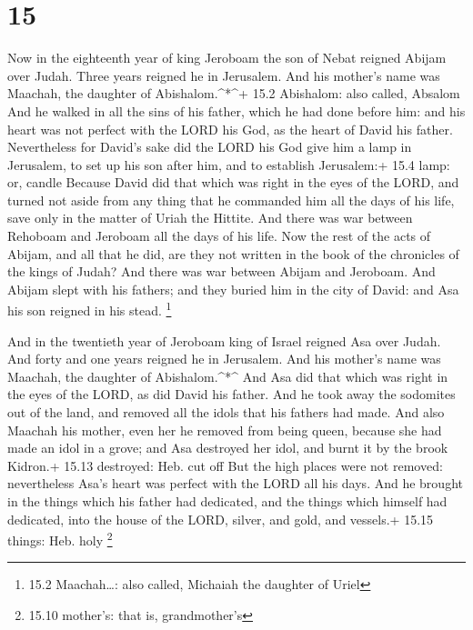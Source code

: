 \hypertarget{section-14}{%
\section{15}\label{section-14}}

 Now in the eighteenth year of king Jeroboam the son of
Nebat reigned Abijam over Judah.  Three years reigned he in
Jerusalem. And his mother's name was Maachah, the daughter of
Abishalom.\^{}*\^{}+ 15.2 Abishalom: also called, Absalom 
And he walked in all the sins of his father, which he had done before
him: and his heart was not perfect with the LORD his God, as the heart
of David his father.  Nevertheless for David's sake did the
LORD his God give him a lamp in Jerusalem, to set up his son after him,
and to establish Jerusalem:+ 15.4 lamp: or, candle  Because
David did that which was right in the eyes of the LORD, and turned not
aside from any thing that he commanded him all the days of his life,
save only in the matter of Uriah the Hittite.  And there was
war between Rehoboam and Jeroboam all the days of his life. 
Now the rest of the acts of Abijam, and all that he did, are they not
written in the book of the chronicles of the kings of Judah? And there
was war between Abijam and Jeroboam.  And Abijam slept with
his fathers; and they buried him in the city of David: and Asa his son
reigned in his stead. \footnote{15.2 Maachah\ldots: also called,
  Michaiah the daughter of Uriel}

 And in the twentieth year of Jeroboam king of Israel
reigned Asa over Judah.  And forty and one years reigned he
in Jerusalem. And his mother's name was Maachah, the daughter of
Abishalom.\^{}*\^{}  And Asa did that which was right in
the eyes of the LORD, as did David his father.  And he took
away the sodomites out of the land, and removed all the idols that his
fathers had made.  And also Maachah his mother, even her he
removed from being queen, because she had made an idol in a grove; and
Asa destroyed her idol, and burnt it by the brook Kidron.+ 15.13
destroyed: Heb. cut off  But the high places were not
removed: nevertheless Asa's heart was perfect with the LORD all his
days.  And he brought in the things which his father had
dedicated, and the things which himself had dedicated, into the house of
the LORD, silver, and gold, and vessels.+ 15.15 things: Heb. holy
\footnote{15.10 mother's: that is, grandmother's}

